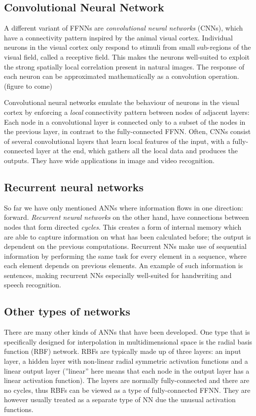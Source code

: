 \documentclass[%
oneside,                 %
final,                   %
10pt]{article}
\begin{document}
\subsection{Convolutional Neural Network}

A different variant of FFNNs are \emph{convolutional neural networks}
(CNNs), which have a connectivity pattern inspired by the animal
visual cortex. Individual neurons in the visual cortex only respond to
stimuli from small sub-regions of the visual field, called a receptive
field. This makes the neurons well-suited to exploit the strong
spatially local correlation present in natural images. The response of
each neuron can be approximated mathematically as a convolution
operation.  (figure to come)

Convolutional neural networks emulate the behaviour of neurons in the
visual cortex by enforcing a \emph{local} connectivity pattern between
nodes of adjacent layers: Each node in a convolutional layer is
connected only to a subset of the nodes in the previous layer, in
contrast to the fully-connected FFNN.  Often, CNNs consist of several
convolutional layers that learn local features of the input, with a
fully-connected layer at the end, which gathers all the local data and
produces the outputs. They have wide applications in image and video
recognition.

\subsection{Recurrent neural networks}

So far we have only mentioned ANNs where information flows in one
direction: forward. \emph{Recurrent neural networks} on the other hand,
have connections between nodes that form directed \emph{cycles}. This
creates a form of internal memory which are able to capture
information on what has been calculated before; the output is
dependent on the previous computations. Recurrent NNs make use of
sequential information by performing the same task for every element
in a sequence, where each element depends on previous elements. An
example of such information is sentences, making recurrent NNs
especially well-suited for handwriting and speech recognition.

\subsection{Other types of networks}

There are many other kinds of ANNs that have been developed. One type
that is specifically designed for interpolation in multidimensional
space is the radial basis function (RBF) network. RBFs are typically
made up of three layers: an input layer, a hidden layer with
non-linear radial symmetric activation functions and a linear output
layer (''linear'' here means that each node in the output layer has a
linear activation function). The layers are normally fully-connected
and there are no cycles, thus RBFs can be viewed as a type of
fully-connected FFNN. They are however usually treated as a separate
type of NN due the unusual activation functions.
\end{document}
